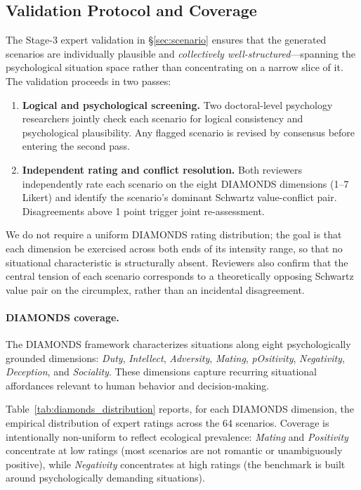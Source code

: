 \subsection{Validation Protocol and Coverage}
\label{app:scenario_validation}

The Stage-3 expert validation in \S\ref{sec:scenario} ensures that the generated scenarios are individually plausible and \emph{collectively well-structured}---spanning the psychological situation space rather than concentrating on a narrow slice of it. The validation proceeds in two passes:

\begin{enumerate}[leftmargin=1.5em, itemsep=2pt]
  \item \textbf{Logical and psychological screening.} Two doctoral-level psychology researchers jointly check each scenario for logical consistency and psychological plausibility. Any flagged scenario is revised by consensus before entering the second pass.
  \item \textbf{Independent rating and conflict resolution.} Both reviewers independently rate each scenario on the eight DIAMONDS dimensions (1--7 Likert) and identify the scenario's dominant Schwartz value-conflict pair. Disagreements above 1 point trigger joint re-assessment.
\end{enumerate}

We do not require a uniform DIAMONDS rating distribution; the goal is that each dimension be exercised across both ends of its intensity range, so that no situational characteristic is structurally absent. Reviewers also confirm that the central tension of each scenario corresponds to a theoretically opposing Schwartz value pair on the circumplex, rather than an incidental disagreement.

\paragraph{DIAMONDS coverage.}
\label{app:diamonds_coverage}
The DIAMONDS framework characterizes situations along eight psychologically grounded dimensions: \textit{Duty}, \textit{Intellect}, \textit{Adversity}, \textit{Mating}, \textit{pOsitivity}, \textit{Negativity}, \textit{Deception}, and \textit{Sociality}. These dimensions capture recurring situational affordances relevant to human behavior and decision-making.

Table~\ref{tab:diamonds_distribution} reports, for each DIAMONDS dimension, the empirical distribution of expert ratings across the 64 scenarios. Coverage is intentionally non-uniform to reflect ecological prevalence: \textit{Mating} and \textit{Positivity} concentrate at low ratings (most scenarios are not romantic or unambiguously positive), while \textit{Negativity} concentrates at high ratings (the benchmark is built around psychologically demanding situations).


